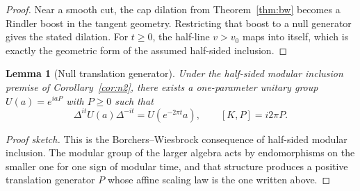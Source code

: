 \documentclass[11pt]{article}
\newtheorem{lemma}[theorem]{Lemma}
\begin{document}
\begin{proof}
Near a smooth cut, the cap dilation from Theorem~\ref{thm:bw} becomes a Rindler boost in the tangent geometry. Restricting that boost to a null generator gives the stated dilation. For \(t\ge 0\), the half-line \(v>v_0\) maps into itself, which is exactly the geometric form of the assumed half-sided inclusion.
\end{proof}

\begin{lemma}[Null translation generator]\label{lem:translation}
Under the half-sided modular inclusion premise of Corollary~\ref{cor:n2}, there exists a one-parameter unitary group \(U(a)=e^{iaP}\) with \(P\ge 0\) such that
\[
\Delta^{it}U(a)\Delta^{-it}=U(e^{-2\pi t}a),
\qquad
[K,P]=i2\pi P.
\]
\end{lemma}

\begin{proof}[Proof sketch]
This is the Borchers--Wiesbrock consequence of half-sided modular inclusion. The modular group of the larger algebra acts by endomorphisms on the smaller one for one sign of modular time, and that structure produces a positive translation generator \(P\) whose affine scaling law is the one written above.
\end{proof}
\end{document}
